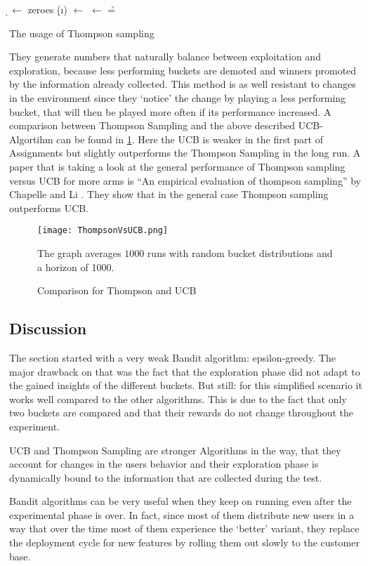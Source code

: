 \documentclass[main.tex]{subfiles}
\begin{document}
\begin{algorithm}
\KwIn{\b}
\BlankLine
\d $\leftarrow$ zeroes \;
{
\d(\i) $\leftarrow$ \draw{\b{\i}}
}
\nb $\leftarrow$ \max{\d} \;
\r = \rw{\nb}\;

\caption[Thompson Sampling]{The usage of Thompson sampling}
\label{alg:ThompsonSampling}
\end{algorithm}

They generate numbers that naturally balance between exploitation and exploration, because less performing buckets are demoted and winners promoted by the information already collected. This method is as well resistant to changes in the environment since they `notice' the change by playing a less performing bucket, that will then be played more often if its performance increased. A comparison between Thompson Sampling and the above described UCB-Algortihm can be found in \ref{fig:ThompsonVsUCB}. Here the UCB is weaker in the first part of Assignments but slightly outperforms the Thompson Sampling in the long run. A paper that is taking a look at the general performance of Thompson sampling versus UCB for more arms is ``An empirical evaluation of thompson sampling'' by Chapelle and Li \cite{chapelle2011empirical}. They show that in the general case Thompson sampling outperforms UCB.

\begin{figure}[ht]
\texttt{[image: ThompsonVsUCB.png]}
\centering
\caption{Comparison for Thompson and UCB}
The graph averages $1000$ runs with random bucket distributions and a horizon of 1000.
\label{fig:ThompsonVsUCB}
\end{figure}

\subsection{Discussion}
The section started with a very weak Bandit algorithm: epsilon-greedy. The major drawback on that was the fact that the exploration phase did not adapt to the gained insights of the different buckets. But still: for this simplified scenario it works well compared to the other algorithms. This is due to the fact that only two buckets are compared and that their rewards do not change throughout the experiment.

UCB and Thompson Sampling are stronger Algorithms in the way, that they account for changes in the users behavior and their exploration phase is dynamically bound to the information that are collected during the test.

Bandit algorithms can be very useful when they keep on running even after the experimental phase is over. In fact, since most of them distribute new users in a way that over the time most of them experience the `better' variant, they replace the deployment cycle for new features by rolling them out slowly to the customer base.
\end{document}
